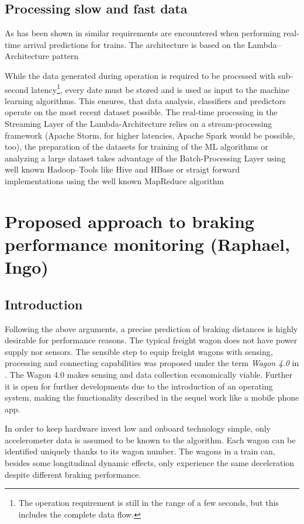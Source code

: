 \documentclass[a4paper, 12pt]{scrartcl}
\begin{document}
\subsection{Processing slow and fast data}
As has been shown in \cite{elsen:M318} similar requirements are encountered when performing real-time arrival predictions for trains. The architecture is based on the Lambda--Architecture pattern \cite{Marz2015}

While the data generated during operation is required to be processed with sub-second latency\footnote{The operation requirement is still in the range of a few seconds, but this includes the complete data flow.}, every date must be stored and is used as input to the machine learning algorithms. This ensures, that data analysis, classifiers and predictors operate on the most recent dataset possible. The real-time processing in the Streaming Layer of the Lambda-Architecture relies on a stream-processing framework (Apache Storm, for higher latencies, Apache Spark would be possible, too), the preparation of the datasets for training of the ML algorithms or analyzing a large dataset takes advantage of the Batch-Processing Layer using well known Hadoop--Tools like Hive and HBase or straigt forward implementations using the well known MapReduce algorithm \cite{Dean:2004:MSD:1251254.1251264}

\section{Proposed approach to braking performance monitoring (Raphael, Ingo)}
\subsection{Introduction}
Following the above arguments, a precise prediction of braking distances is highly desirable for performance reasons. The typical freight wagon does not have power supply nor sensors. The sensible step to equip freight wagons with sensing, processing and connecting capabilities was proposed under the term \textit{Wagon 4.0} in \cite{pfaff2017stephenson}. The Wagon 4.0 makes sensing and data collection economically viable. Further it is open for further developments due to the introduction of an operating system, making the functionality described in the sequel work like a mobile phone app.

In order to keep hardware invest low and onboard technology simple, only accelerometer data is assumed to be known to the algorithm. Each wagon can be identified uniquely thanks to its wagon number. The wagons in a train can, besides some longitudinal dynamic effects, only experience the same deceleration despite different braking performance.
\end{document}
